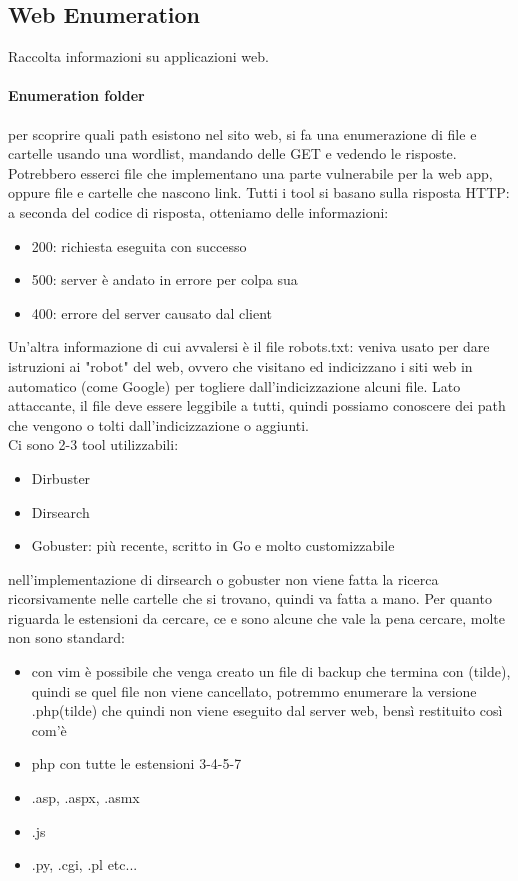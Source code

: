 \documentclass{article}
\begin{document}
\subsection{Web Enumeration}
Raccolta informazioni su applicazioni web.
\paragraph{Enumeration folder}per scoprire quali path esistono nel sito web, si fa una enumerazione di file e cartelle usando una wordlist, mandando delle GET e vedendo le risposte. Potrebbero esserci file che implementano una parte vulnerabile per la web app, oppure file e cartelle che nascono link. Tutti i tool si basano sulla risposta HTTP: a seconda del codice di risposta, otteniamo delle informazioni:
\begin{itemize}
\item 200: richiesta eseguita con successo
\item 500: server è andato in errore per colpa sua
\item 400: errore del server causato dal client
\end{itemize}
Un'altra informazione di cui avvalersi è il file robots.txt: veniva usato per dare istruzioni ai "robot" del web, ovvero che visitano ed indicizzano i siti web in automatico (come Google) per togliere dall'indicizzazione alcuni file. Lato attaccante, il file deve essere leggibile a tutti, quindi possiamo conoscere dei path che vengono o tolti dall'indicizzazione o aggiunti.\\ Ci sono 2-3 tool utilizzabili:
\begin{itemize}
\item Dirbuster
\item Dirsearch
\item Gobuster: più recente, scritto in Go e molto customizzabile
\end{itemize}
nell'implementazione di dirsearch o gobuster non viene fatta la ricerca ricorsivamente nelle cartelle che si trovano, quindi va fatta a mano. Per quanto riguarda le estensioni da cercare, ce e sono alcune che vale la pena cercare, molte non sono standard:
\begin{itemize}
\item con vim è possibile che venga creato un file di backup che termina con (tilde), quindi se quel file non viene cancellato, potremmo enumerare la versione .php(tilde) che quindi non viene eseguito dal server web, bensì restituito così com'è
\item php con tutte le estensioni 3-4-5-7
\item .asp, .aspx, .asmx
\item .js
\item .py, .cgi, .pl etc...
\end{itemize}
\end{document}
